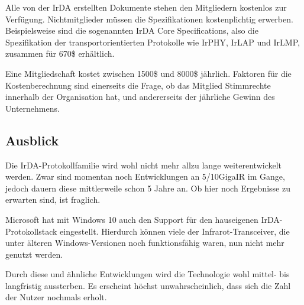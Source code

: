 \begin{multicols}{3}
Alle von der IrDA erstellten Dokumente stehen den Mitgliedern kostenlos zur Verfügung. Nichtmitglieder müssen die Spezifikationen kostenplichtig erwerben. Beispielsweise sind die sogenannten IrDA Core Specifications, also die Spezifikation der transportorientierten Protokolle wie IrPHY, IrLAP und IrLMP, zusammen für 670\$ erhältlich.

Eine Mitgliedschaft kostet zwischen 1500\$ und 8000\$ jährlich. Faktoren für die Kostenberechnung sind einerseits die Frage, ob das Mitglied Stimmrechte innerhalb der Organisation hat, und andererseits der jährliche Gewinn des Unternehmens.

\subsection*{Ausblick}
Die IrDA-Protokollfamilie wird wohl nicht mehr allzu lange weiterentwickelt werden. Zwar sind momentan noch Entwicklungen an 5/10GigaIR im Gange, jedoch dauern diese mittlerweile schon 5 Jahre an. Ob hier noch Ergebnisse zu erwarten sind, ist fraglich.

Microsoft hat mit Windows 10 auch den Support für den hauseigenen IrDA-Protokollstack eingestellt. Hierdurch können viele der Infrarot-Transceiver, die unter älteren Windows-Versionen noch funktionsfähig waren, nun nicht mehr genutzt werden. 

Durch diese und ähnliche Entwicklungen wird die Technologie wohl mittel- bis langfristig aussterben. Es erscheint höchst unwahrscheinlich, dass sich die Zahl der Nutzer nochmals erholt.

\printbibliography[segment=11,heading=subbibliography]
\end{multicols}

\newpage
